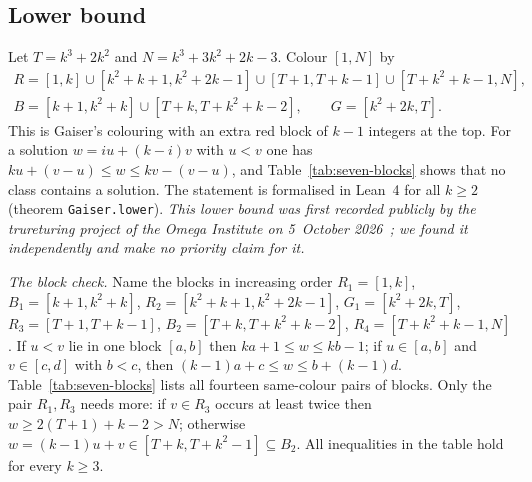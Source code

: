 \documentclass[11pt]{amsart}
\theoremstyle{definition}
\begin{document}
\subsection*{Lower bound} Let $T=k^3+2k^2$ and $N=k^3+3k^2+2k-3$. Colour $[1,N]$ by
\begin{gather*}
R=[1,k]\cup[k^2+k+1,k^2+2k-1]\cup[T+1,T+k-1]\cup[T+k^2+k-1,N],\\
B=[k+1,k^2+k]\cup[T+k,T+k^2+k-2],\qquad G=[k^2+2k,T].
\end{gather*}
This is Gaiser's colouring with an extra red block of $k-1$ integers at the top. For a solution $w=iu+(k-i)v$ with $u<v$ one has $ku+(v-u)\le w\le kv-(v-u)$, and Table~\ref{tab:seven-blocks} shows that no class contains a solution. The statement is formalised in Lean~4 for all $k\ge2$ (theorem \texttt{Gaiser.lower}). \emph{This lower bound was first recorded publicly by the trureturing project of the Omega Institute on 5~October 2026~\cite{omega}; we found it independently and make no priority claim for it.}

\smallskip\noindent\emph{The block check.} Name the blocks in increasing order $R_1=[1,k]$, $B_1=[k+1,k^2+k]$, $R_2=[k^2+k+1,k^2+2k-1]$, $G_1=[k^2+2k,T]$, $R_3=[T+1,T+k-1]$, $B_2=[T+k,T+k^2+k-2]$, $R_4=[T+k^2+k-1,N]$. If $u<v$ lie in one block $[a,b]$ then $ka+1\le w\le kb-1$; if $u\in[a,b]$ and $v\in[c,d]$ with $b<c$, then $(k-1)a+c\le w\le b+(k-1)d$. Table~\ref{tab:seven-blocks} lists all fourteen same-colour pairs of blocks. Only the pair $R_1,R_3$ needs more: if $v\in R_3$ occurs at least twice then $w\ge2(T+1)+k-2>N$; otherwise $w=(k-1)u+v\in[T+k,T+k^2-1]\subseteq B_2$. All inequalities in the table hold for every $k\ge3$.
\end{document}

